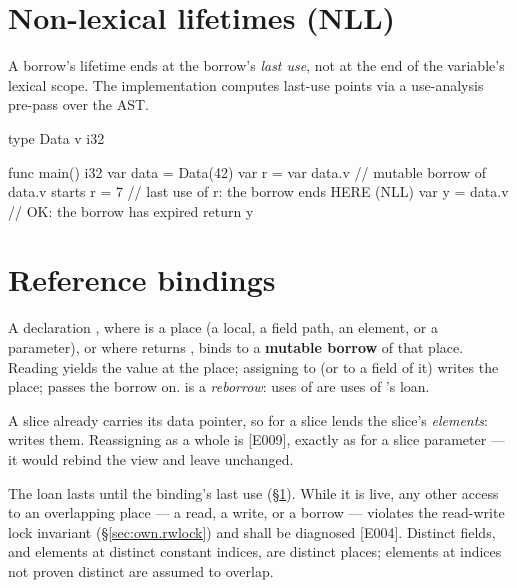 \section{Non-lexical lifetimes (NLL)}
\label{sec:own.nll}

\pnum
A borrow's lifetime ends at the borrow's \textit{last use}, not at the end
of the variable's lexical scope.  The implementation computes last-use
points via a use-analysis pre-pass over the AST.

\begin{example}
\begin{laincode}
type Data {
    v i32
}

func main() i32 {
    var data = Data(42)
    var r = var data.v         // mutable borrow of data.v starts
    r = 7                      // last use of r: the borrow ends HERE (NLL)
    var y = data.v             // OK: the borrow has expired
    return y
}
\end{laincode}
\end{example}

\section{Reference bindings}
\label{sec:own.refbind}

\pnum
A declaration , where  is a place (a local, a field path, an
element, or a  parameter), or  where  returns
, binds  to a \textbf{mutable borrow} of that place.  Reading 
yields the value at the place; assigning to  (or to a field of it) writes the place;
 passes the borrow on.   is a \textit{reborrow}: uses of
 are uses of 's loan.

\pnum
A slice already carries its data pointer, so  for a slice  lends
the slice's \emph{elements}:  writes them.  Reassigning  as a whole is
\illformed{} [E009], exactly as for a  slice parameter --- it would rebind the view
and leave  unchanged.

\pnum
The loan lasts until the binding's last use (\S\ref{sec:own.nll}).  While it is live, any
other access to an overlapping place --- a read, a write, or a borrow --- violates the
read-write lock invariant (\S\ref{sec:own.rwlock}) and shall be diagnosed [E004].  Distinct
fields, and elements at distinct constant indices, are distinct places; elements at indices
not proven distinct are assumed to overlap.

